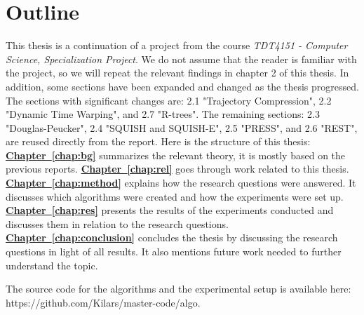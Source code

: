 \section{Outline}
This thesis is a continuation of a project from the course \textit{TDT4151 - Computer Science, Specialization Project}. We do not assume that the reader is familiar with the project, so we will repeat the relevant findings in chapter 2 of this thesis. In addition, some sections have been expanded and changed as the thesis progressed. The sections with significant changes are: 2.1 "Trajectory Compression", 2.2 "Dynamic Time Warping", and 2.7 "R-trees". The remaining sections: 2.3 "Douglas-Peucker", 2.4 "SQUISH and SQUISH-E", 2.5 "PRESS", and 2.6 "REST", are reused directly from the report. Here is the structure of this thesis:\newline\newline
\textbf{\hyperref[chap:bg]{Chapter~\ref*{chap:bg}}} summarizes the relevant theory, it is mostly based on the previous reports.
\newline
\textbf{\hyperref[chap:rel]{Chapter~\ref*{chap:rel}}} goes through work related to this thesis.
\newline
\textbf{\hyperref[chap:method]{Chapter~\ref*{chap:method}}} explains how the research questions were answered. It discusses which algorithms were created and how the experiments were set up.
\newline
\textbf{\hyperref[chap:res]{Chapter~\ref*{chap:res}}} presents the results of the experiments conducted and discusses them in relation to the research questions.
\newline
\textbf{\hyperref[chap:conclusion]{Chapter~\ref*{chap:conclusion}}} concludes the thesis by discussing the research questions in light of all results. It also mentions future work needed to further understand the topic.


The source code for the algorithms and the experimental setup is available here: https://github.com/Kilars/master-code/algo.

